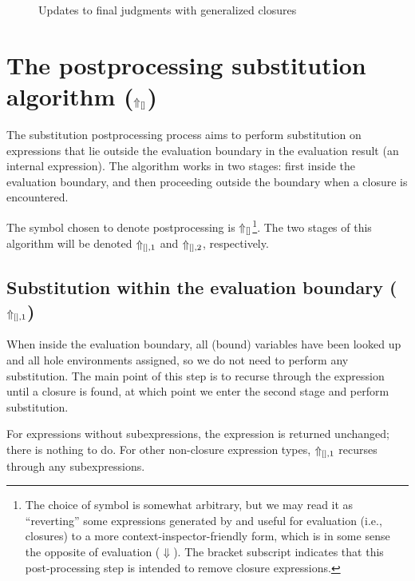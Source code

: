 \begin{figure}
  \centering
  \begin{mdframed}
    \begin{singlespace}
      
    \end{singlespace}
  \end{mdframed}
  \caption{Updates to final judgments with generalized closures}
  \label{fig:update-final-judgment}
\end{figure}

\section{The postprocessing substitution algorithm ($\Uparrow_{[]}$)}
\label{sec:postprocessing-substitution}

The substitution postprocessing process aims to perform substitution on expressions that lie outside the evaluation boundary in the evaluation result (an internal expression). The algorithm works in two stages: first inside the evaluation boundary, and then proceeding outside the boundary when a closure is encountered.

The symbol chosen to denote postprocessing is $\Uparrow_{[]}$\footnote{The choice of symbol is somewhat arbitrary, but we may read it as ``reverting'' some expressions generated by and useful for evaluation (i.e., closures) to a more context-inspector-friendly form, which is in some sense the opposite of evaluation ($\Downarrow$). The bracket subscript indicates that this post-processing step is intended to remove closure expressions.}. The two stages of this algorithm will be denoted $\Uparrow_{[],1}$ and $\Uparrow_{[],2}$, respectively.

\subsection{Substitution within the evaluation boundary ($\Uparrow_{[],1}$)}
\label{sec:postprocessing-subst-inside}

When inside the evaluation boundary, all (bound) variables have been looked up and all hole environments assigned, so we do not need to perform any substitution. The main point of this step is to recurse through the expression until a closure is found, at which point we enter the second stage and perform substitution.

For expressions without subexpressions, the expression is returned unchanged; there is nothing to do. For other non-closure expression types, $\Uparrow_{[],1}$ recurses through any subexpressions.

